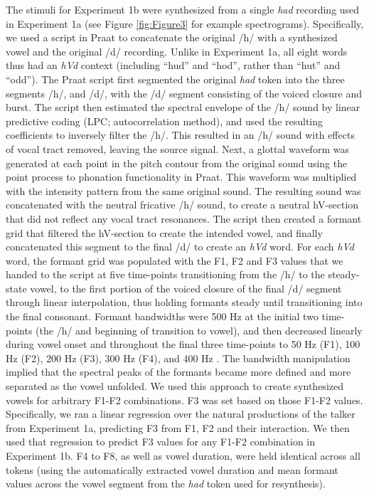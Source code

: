 \documentclass[preprint]{JASA}
\begin{document}
The stimuli for Experiment 1b were synthesized from a single \emph{had} recording used in Experiment 1a (see Figure \ref{fig:Figure3} for example spectrograms). Specifically, we used a script \citep[based on descriptions in][]{wade2007} in Praat \citep{boersma-weenink2022} to concatenate the original /h/ with a synthesized vowel and the original /d/ recording. Unlike in Experiment 1a, all eight words thus had an \emph{hVd} context (including ``hud'' and ``hod'', rather than ``hut'' and ``odd''). The Praat script first segmented the original \emph{had} token into the three segments /h/,  and /d/, with the /d/ segment consisting of the voiced closure and burst. The script then estimated the spectral envelope of the /h/ sound by linear predictive coding (LPC; autocorrelation method), and used the resulting coefficients to inversely filter the /h/. This resulted in an /h/ sound with effects of vocal tract removed, leaving the source signal. Next, a glottal waveform was generated at each point in the pitch contour from the original  sound using the point process to phonation functionality in Praat. This waveform was multiplied with the intensity pattern from the same original  sound. The resulting sound was concatenated with the neutral fricative /h/ sound, to create a neutral hV-section that did not reflect any vocal tract resonances. The script then created a formant grid that filtered the hV-section to create the intended vowel, and finally concatenated this segment to the final /d/ to create an \emph{hVd} word. For each \emph{hVd} word, the formant grid was populated with the F1, F2 and F3 values that we handed to the script at five time-points transitioning from the /h/ to the steady-state vowel, to the first portion of the voiced closure of the final /d/ segment through linear interpolation, thus holding formants steady until transitioning into the final consonant. Formant bandwidths were 500 Hz at the initial two time-points (the /h/ and beginning of transition to vowel), and then decreased linearly during vowel onset and throughout the final three time-points to 50 Hz (F1), 100 Hz (F2), 200 Hz (F3), 300 Hz (F4), and 400 Hz \citep[F5-F8, following][]{wade2007}. The bandwidth manipulation implied that the spectral peaks of the formants became more defined and more separated as the vowel unfolded. We used this approach to create synthesized vowels for arbitrary F1-F2 combinations. F3 was set based on those F1-F2 values. Specifically, we ran a linear regression over the natural productions of the talker from Experiment 1a, predicting F3 from F1, F2 and their interaction. We then used that regression to predict F3 values for any F1-F2 combination in Experiment 1b. F4 to F8, as well as vowel duration, were held identical across all tokens (using the automatically extracted vowel duration and mean formant values across the vowel segment from the \emph{had} token used for resynthesis).
\end{document}

